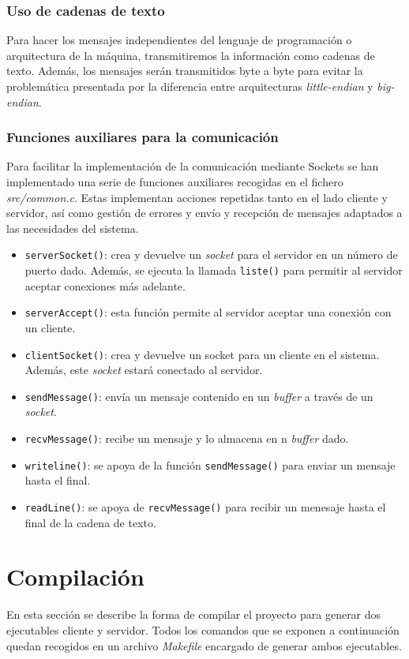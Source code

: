 \documentclass[]{article}
\begin{document}
\subsubsection{Uso de cadenas de texto}
\label{subsec:cadenas-texto}
Para hacer los mensajes independientes del lenguaje de programación o arquitectura de la máquina, transmitiremos la información como cadenas de texto. Además, los mensajes serán transmitidos byte a byte para evitar la problemática presentada por la diferencia entre  arquitecturas \textit{little-endian} y \textit{big-endian}.

\subsubsection{Funciones auxiliares para la comunicación}
\label{subsec:funciones}
Para facilitar la implementación de la comunicación mediante Sockets se han implementado una serie de funciones auxiliares recogidas en el fichero \textit{src/common.c}. Estas implementan acciones repetidas tanto en el lado cliente y servidor, así como gestión de errores y envío y recepción de mensajes adaptados a las necesidades del sistema. 

\begin{itemize}
    \item \texttt{serverSocket()}: crea y devuelve un \textit{socket} para el servidor en un número de puerto dado. Además, se ejecuta la llamada \texttt{liste()} para permitir al servidor aceptar conexiones más adelante. 
    \item \texttt{serverAccept()}: esta función permite al servidor aceptar una conexión con un cliente. 
    \item \texttt{clientSocket()}: crea y devuelve un socket para un cliente en el sistema. Además, este \textit{socket} estará conectado al servidor. 
    \item \texttt{sendMessage()}: envía un mensaje contenido en un \textit{buffer} a través de un \textit{socket}. 
    \item \texttt{recvMessage()}: recibe un mensaje y lo almacena en n \textit{buffer} dado. 
    \item \texttt{writeline()}: se apoya de la función \texttt{sendMessage()} para enviar un mensaje hasta el final. 
    \item \texttt{readLine()}: se apoya de \texttt{recvMessage()} para recibir un menesaje hasta el final de la cadena de texto. 
\end{itemize}

\section{Compilación}
\label{sec:compilacion}
En esta sección se describe la forma de compilar el proyecto para generar dos ejecutables cliente y servidor. Todos los comandos que se exponen a continuación quedan recogidos en un archivo \textit{Makefile} encargado de generar ambos ejecutables. 
\end{document}
